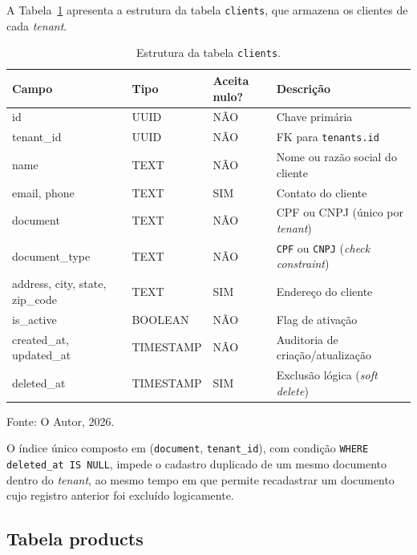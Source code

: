 A Tabela~\ref{tab:tabela-clients} apresenta a estrutura da tabela \texttt{clients}, que armazena os clientes de cada \textit{tenant}.

\begin{table}[H]
  \centering
  \caption{Estrutura da tabela \texttt{clients}.}
  \label{tab:tabela-clients}
  \begin{tabular}{p{3.1cm}p{2.3cm}p{1.6cm}p{5.7cm}}
    \hline
    \textbf{Campo} & \textbf{Tipo} & \textbf{Aceita nulo?} & \textbf{Descrição} \\
    \hline
    id & UUID & NÃO & Chave primária \\
    tenant\_id & UUID & NÃO & FK para \texttt{tenants.id} \\
    name & TEXT & NÃO & Nome ou razão social do cliente \\
    email, phone & TEXT & SIM & Contato do cliente \\
    document & TEXT & NÃO & CPF ou CNPJ (único por \textit{tenant}) \\
    document\_type & TEXT & NÃO & \texttt{CPF} ou \texttt{CNPJ} (\textit{check constraint}) \\
    address, city, state, zip\_code & TEXT & SIM & Endereço do cliente \\
    is\_active & BOOLEAN & NÃO & Flag de ativação \\
    created\_at, updated\_at & TIMESTAMP & NÃO & Auditoria de criação/atualização \\
    deleted\_at & TIMESTAMP & SIM & Exclusão lógica (\textit{soft delete}) \\
    \hline
  \end{tabular}
  \begin{minipage}{0.95\textwidth}
    \vspace{0.3em}
    {\small Fonte: O Autor, 2026.}
  \end{minipage}
\end{table}

O índice único composto em (\texttt{document}, \texttt{tenant\_id}), com condição \texttt{WHERE deleted\_at IS NULL}, impede o cadastro duplicado de um mesmo documento dentro do \textit{tenant}, ao mesmo tempo em que permite recadastrar um documento cujo registro anterior foi excluído logicamente.

\subsection{Tabela products}
\label{sec:tabela-products}


